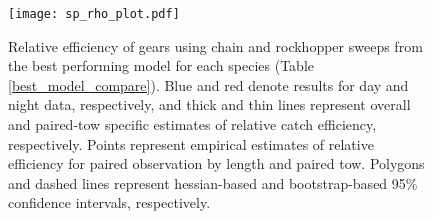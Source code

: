 \documentclass[]{article}
\begin{document}
\begin{figure}
\caption{Relative efficiency  of gears using chain and rockhopper sweeps from the best performing model for each species (Table \ref{best_model_compare}). Blue and red denote results for day and night data, respectively, and thick and thin lines represent overall and paired-tow specific estimates of relative catch efficiency, respectively. Points represent empirical estimates of relative efficiency for paired observation by length and paired tow. Polygons and dashed lines represent hessian-based and bootstrap-based 95\% confidence intervals, respectively.}\label{sp_rho_plot}
\begin{center}
\texttt{[image: sp\_rho\_plot.pdf]}
\end{center}
\end{figure}

\clearpage
\end{document}
